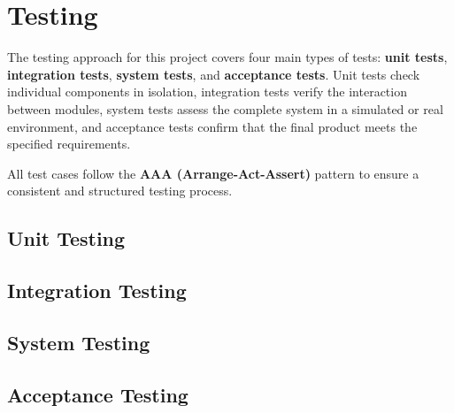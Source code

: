 \chapter{Testing}

The testing approach for this project covers four main types of tests: \textbf{unit tests}, \textbf{integration tests}, \textbf{system tests}, and \textbf{acceptance tests}. Unit tests check individual components in isolation, integration tests verify the interaction between modules, system tests assess the complete system in a simulated or real environment, and acceptance tests confirm that the final product meets the specified requirements.

All test cases follow the \textbf{AAA (Arrange-Act-Assert)} pattern to ensure a consistent and structured testing process.

\section{Unit Testing}
\section{Integration Testing}
\section{System Testing}
\section{Acceptance Testing}
